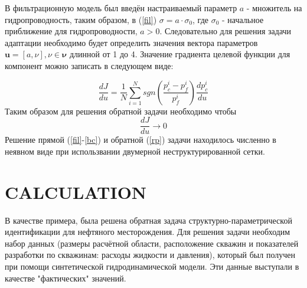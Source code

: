 \documentclass{article}
\begin{document}
В фильтрационную модель был введён настраиваемый параметр $a$ - множитель на гидропроводность, таким образом, в (\ref{fil}) $\sigma = a\cdot\sigma_0$, где $\sigma_0$ - начальное приближение для гидропроводности, $a>0$. Следовательно для решения задачи адаптации необходимо будет определить значения вектора параметров $\boldsymbol{u} = [a, \nu], \nu \in \boldsymbol{\nu}$ длинной от 1 до 4. Значение градиента целевой функции для компонент можно записать в следующем виде:

\begin{equation}
\frac{dJ}{du} = \frac{1}{N}\sum_{i=1}^N sgn\left(\frac{p_c^i-p_f^i}{p_f^i}\right)\frac{dp_c^i}{du}
\end{equation}
Таким образом для решения обратной задачи необходимо чтобы
\begin{equation} \label{rp}
	 \frac{dJ}{du} \rightarrow 0
\end{equation}
Решение прямой (\ref{fil}-\ref{bc}) и обратной (\ref{rp}) задачи находилось численно в неявном виде 
при использвании двумерной неструктурированной сетки.

\section{CALCULATION}
В качестве примера, была решена обратная задача структурно-параметрической идентификации для нефтяного месторождения. Для решения задачи необходим набор данных (размеры расчётной области, расположение скважин и показателей разработки по скважинам: расходы жидкости и давления), который был получен при помощи синтетической гидродинамической модели. Эти данные выступали в качестве "фактических" значений. 
\end{document}
